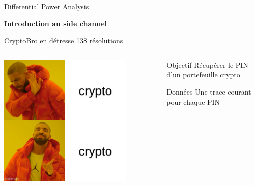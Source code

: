 \begin{frame}{Differential Power Analysis}
    \large{\centerline{\textbf{Introduction au side channel}}}

\end{frame}

\begin{frame}{CryptoBro en détresse \FiveStar \hfill 138 résolutions}
    \begin{columns}[c]
        \begin{center}                  
            \includegraphics[width=0.8\textwidth]{img/meme/cryptobros.png}
        \end{center}

           \begin{outline}
               \1 Objectif
                \2 Récupérer le PIN d'un portefeuille crypto

            \pause
               \1 Données
                \2 Une trace courant pour chaque PIN
           \end{outline}
    \end{columns}
\end{frame}


